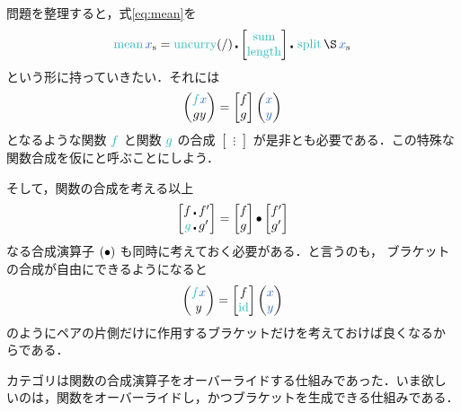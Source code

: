 \documentclass[a5paper,twoside,fleqn,draft]{jsbook}
\begin{document}
問題を整理すると，式\eqref{eq:mean}を
\begin{equation}
  \mMean\mList{x}
  =\mUncurry(/)
  \hCompose
  \begin{bmatrix}
    \mSum\\
    \mLength
  \end{bmatrix}
  \hCompose{}
  \mSplit
  \hApply
  \mList{x}
\end{equation}
という形に持っていきたい．それには
\begin{equation}
  \mPairWith{\hFunc{f}\hVar{x}}{gy}
  =
  \begin{bmatrix}
    f\\
    g
  \end{bmatrix}
  \mPairWith{\hVar{x}}{\hVar{y}}
\end{equation}
となるような関数 $\hFunc{f}$ と関数 $\hFunc{g}$ の合成
$\begin{bmatrix}\vdots\end{bmatrix}$ が是非とも必要である．この特殊な
  関数合成を仮にと呼ぶことにしよう．

そして，関数の合成を考える以上
\begin{equation}
  \begin{bmatrix}
    f\hCompose f'\\
    \hFunc{g}\hCompose g'
  \end{bmatrix}
  =
  \begin{bmatrix}
    f\\
    g
  \end{bmatrix}
  \mCompCat
  \begin{bmatrix}
    f'\\
    g'
  \end{bmatrix}
\end{equation}
なる合成演算子 $(\operatorname{\bullet})$ も同時に考えておく必要がある．と言うのも，
ブラケットの合成が自由にできるようになると
\begin{equation}
  \mPairWith{\hFunc{f}\hVar{x}}{y}
  =
  \begin{bmatrix}
    f\\
    \mId
  \end{bmatrix}
  \mPairWith{\hVar{x}}{\hVar{y}}
\end{equation}
のようにペアの片側だけに作用するブラケットだけを考えておけば良くなるか
らである．

\separator

カテゴリは関数の合成演算子をオーバーライドする仕組みであった．いま欲し
いのは，関数をオーバーライドし，かつブラケットを生成できる仕組みである．
\end{document}
